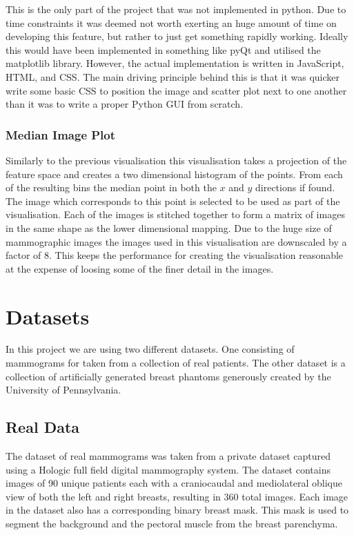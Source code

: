 This is the only part of the project that was not implemented in python. Due to time constraints it was deemed not worth exerting  an huge amount of time on developing this feature, but rather to just get something rapidly working. Ideally this would have been implemented in something like pyQt and utilised the matplotlib library. However, the actual implementation is written in JavaScript, HTML, and CSS. The main driving principle behind this is that it was quicker write some basic CSS to position the image and scatter plot next to one another than it was to write a proper Python GUI from scratch.

\subsubsection{Median Image Plot}
Similarly to the previous visualisation this visualisation takes a projection of the feature space and creates a two dimensional histogram of the points. From each of the resulting bins the median point in both the $x$ and $y$ directions if found. The image which corresponds to this point is selected to be used as part of the visualisation. Each of the images is stitched together to form a matrix of images in the same shape as the lower dimensional mapping. Due to the huge size of mammographic images the images used in this visualisation are downscaled by a factor of 8. This keeps the performance for creating the visualisation reasonable at the expense of loosing some of the finer detail in the images.

\section{Datasets}
\label{sec:datasets}
In this project we are using two different datasets. One consisting of mammograms for taken from a collection of real patients. The other dataset is a collection of artificially generated breast phantoms generously created by the University of Pennsylvania. 

\subsection{Real Data}
The dataset of real mammograms was taken from a private dataset captured using a Hologic full field digital mammography system. The dataset contains images of 90 unique patients each with a craniocaudal and mediolateral oblique view of both the left and right breasts, resulting in 360 total images. Each image in the dataset also has a corresponding binary breast mask. This mask is used to segment the  background and the pectoral muscle from the breast parenchyma.

